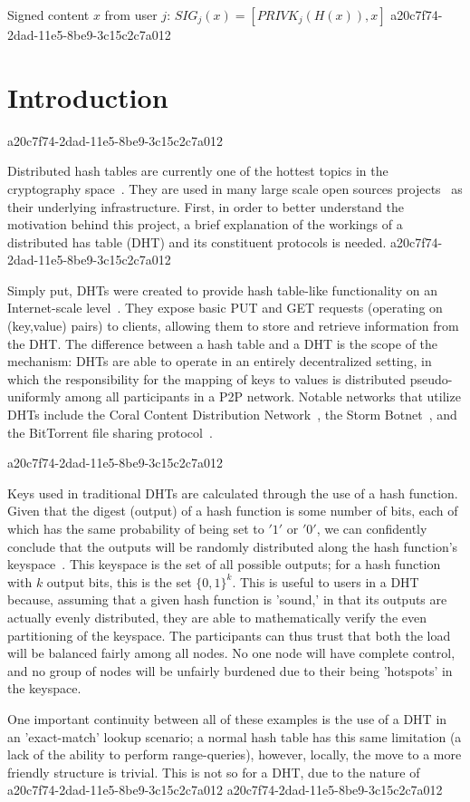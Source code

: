 \documentclass[12pt]{article}
\begin{document}
Signed content $x$ from user $j$: $SIG_j(x) = \left[ PRIVK_j( H(x) ), x \right]$
a20c7f74-2dad-11e5-8be9-3c15c2c7a012
\section{Introduction}
a20c7f74-2dad-11e5-8be9-3c15c2c7a012\par Distributed hash tables are currently one of the hottest topics in the cryptography space~\cite{Stoica:2001dj,Rowstron:2001ea,Ratnasamy:2001wn}. They are used in many large scale open sources projects~\cite{Freitas:2013tb,Xu:2010vs,Perfitt:2010fh} as their underlying infrastructure. First, in order to better understand the motivation behind this project, a brief explanation of the workings of a distributed has table (DHT) and its constituent protocols is needed.
a20c7f74-2dad-11e5-8be9-3c15c2c7a012
\par Simply put, DHTs were created to provide hash table-like functionality on an Internet-scale level~\cite{Ratnasamy:2001wn}. They expose basic PUT and GET requests (operating on (key,value) pairs) to clients, allowing them to store and retrieve information from the DHT. The difference between a hash table and a DHT is the scope of the mechanism: DHTs are able to operate in an entirely decentralized setting, in which the responsibility for the mapping of keys to values is distributed pseudo-uniformly among all participants in a P2P network. Notable networks that utilize DHTs include the Coral Content Distribution Network~\cite{Freedman:2004vb}, the Storm Botnet~\cite{Holz:2008uk}, and the BitTorrent file sharing protocol~\cite{Cohen:y1_8mBnw}.

a20c7f74-2dad-11e5-8be9-3c15c2c7a012\par Keys used in traditional DHTs are calculated through the use of a hash function. Given that the digest (output) of a hash function is some number of bits, each of which has the same probability of being set to $'1'$ or $'0'$, we can confidently conclude that the outputs will be randomly distributed along the hash function's keyspace~. This keyspace is the set of all possible outputs; for a hash function with $k$ output bits, this is the set $\{0,1\}^k$. This is useful to users in a DHT because, assuming that a given hash function is 'sound,' in that its outputs are actually evenly distributed, they are able to mathematically verify the even partitioning of the keyspace. The participants can thus trust that both the load will be balanced fairly among all nodes. No one node will have complete control, and no group of nodes will be unfairly burdened due to their being 'hotspots' in the keyspace.~

\par One important continuity between all of these examples is the use of a DHT in an 'exact-match' lookup scenario; a normal hash table has this same limitation (a lack of the ability to perform range-queries), however, locally, the move to a more friendly structure is trivial. This is not so for a DHT, due to the nature of
a20c7f74-2dad-11e5-8be9-3c15c2c7a012\printbibliography
a20c7f74-2dad-11e5-8be9-3c15c2c7a012
\end{document}
